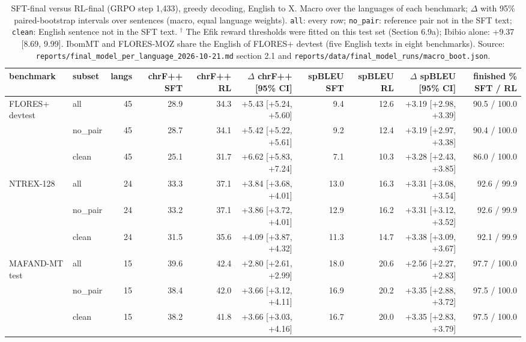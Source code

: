 \begin{table}[t]
\centering
\scriptsize
\setlength{\tabcolsep}{3pt}
\caption{SFT-final versus RL-final (GRPO step 1,433), greedy decoding, English to X. Macro over the languages of each benchmark; \(\Delta\) with 95\% paired-bootstrap intervals over sentences (macro, equal language weights). \texttt{all}: every row; \texttt{no\_pair}: reference pair not in the SFT text; \texttt{clean}: English sentence not in the SFT text. \(^\dagger\) The Efik reward thresholds were fitted on this test set (Section 6.9a); Ibibio alone: +9.37 {[}8.69, 9.99{]}. IbomMT and FLORES-MOZ share the English of FLORES+ devtest (five English texts in eight benchmarks). Source: \texttt{reports/final\_model\_per\_language\_2026-10-21.md} section 2.1 and \texttt{reports/data/final\_model\_runs/macro\_boot.json}.}
\label{tab:t_main}
\begin{adjustbox}{max width=\linewidth}
{\def\LTcaptype{none} %
\begin{tabular}{@{}llrrrrrrrr@{}}
\toprule
benchmark & subset & langs & chrF++ SFT & chrF++ RL & \(\Delta\) chrF++ {[}95\% CI{]} & spBLEU SFT & spBLEU RL & \(\Delta\) spBLEU {[}95\% CI{]} & finished \% SFT / RL \\
\midrule
FLORES+ devtest & all & 45 & 28.9 & 34.3 & +5.43 {[}+5.24, +5.60{]} & 9.4 & 12.6 & +3.19 {[}+2.98, +3.39{]} & 90.5 / 100.0 \\
& no\_pair & 45 & 28.7 & 34.1 & +5.42 {[}+5.22, +5.61{]} & 9.2 & 12.4 & +3.19 {[}+2.97, +3.38{]} & 90.4 / 100.0 \\
& clean & 45 & 25.1 & 31.7 & +6.62 {[}+5.83, +7.24{]} & 7.1 & 10.3 & +3.28 {[}+2.43, +3.85{]} & 86.0 / 100.0 \\
NTREX-128 & all & 24 & 33.3 & 37.1 & +3.84 {[}+3.68, +4.01{]} & 13.0 & 16.3 & +3.31 {[}+3.08, +3.54{]} & 92.6 / 99.9 \\
& no\_pair & 24 & 33.2 & 37.1 & +3.86 {[}+3.72, +4.01{]} & 12.9 & 16.2 & +3.31 {[}+3.12, +3.52{]} & 92.6 / 99.9 \\
& clean & 24 & 31.5 & 35.6 & +4.09 {[}+3.87, +4.32{]} & 11.3 & 14.7 & +3.38 {[}+3.09, +3.67{]} & 92.1 / 99.9 \\
MAFAND-MT test & all & 15 & 39.6 & 42.4 & +2.80 {[}+2.61, +2.99{]} & 18.0 & 20.6 & +2.56 {[}+2.27, +2.83{]} & 97.7 / 100.0 \\
& no\_pair & 15 & 38.4 & 42.0 & +3.66 {[}+3.12, +4.11{]} & 16.9 & 20.2 & +3.35 {[}+2.88, +3.72{]} & 97.5 / 100.0 \\
& clean & 15 & 38.2 & 41.8 & +3.66 {[}+3.03, +4.16{]} & 16.7 & 20.0 & +3.35 {[}+2.83, +3.79{]} & 97.5 / 100.0 \\

\end{tabular}}
\end{adjustbox}
\end{table}
